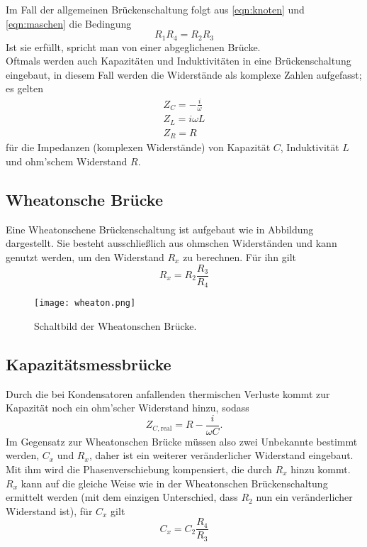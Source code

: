     \noindent Im Fall der allgemeinen Brückenschaltung folgt aus \eqref{eqn:knoten}
    und \eqref{eqn:maschen} die Bedingung 
    \begin{equation}
        R_1 R_4 = R_2 R_3
        \label{eqn:abgleich}
    \end{equation}
    Ist sie erfüllt, spricht man von einer abgeglichenen Brücke. \\
    Oftmals werden auch Kapazitäten und Induktivitäten in eine Brückenschaltung eingebaut,
    in diesem Fall werden die Widerstände als komplexe Zahlen aufgefasst; es gelten
    \begin{align*}
        Z_C = - \frac{i}{\omega}\\
        Z_L = i \omega L\\
        Z_R = R
    \end{align*}
    für die Impedanzen (komplexen Widerstände) von Kapazität $C$, Induktivität $L$ und ohm'schem
    Widerstand $R$.

\subsection{Wheatonsche Brücke}
    Eine Wheatonschene Brückenschaltung ist aufgebaut wie in Abbildung %
    dargestellt. Sie besteht ausschließlich aus ohmschen Widerständen und kann genutzt werden,
    um den Widerstand $R_x$ zu berechnen. Für ihn gilt
    \begin{equation}
        R_x = R_2 \frac{R_3}{R_4}
    \end{equation}

    \begin{figure}
        \centering
        \texttt{[image: wheaton.png]}
        \caption{Schaltbild der Wheatonschen Brücke.}
        \label{fig:kap}
    \end{figure}
        

\subsection{Kapazitätsmessbrücke}
    Durch die bei Kondensatoren anfallenden thermischen Verluste kommt zur Kapazität noch ein ohm'scher Widerstand hinzu, sodass
    \begin{equation}
        Z_{C,\text{real}} = R - \frac{i}{\omega C} .
    \end{equation}
    Im Gegensatz zur Wheatonschen Brücke müssen also zwei Unbekannte bestimmt werden, $C_x$ und $R_x$, daher ist ein weiterer 
    veränderlicher Widerstand eingebaut. Mit ihm wird die Phasenverschiebung kompensiert, die durch $R_x$ hinzu kommt.\\
    $R_x$ kann auf die gleiche Weise wie in der Wheatonschen Brückenschaltung ermittelt werden (mit dem einzigen Unterschied,
    dass $R_2$ nun ein veränderlicher Widerstand ist), für $C_x$ gilt
    \begin{equation}
        C_x = C_2 \frac{R_4}{R_3}
    \end{equation}


